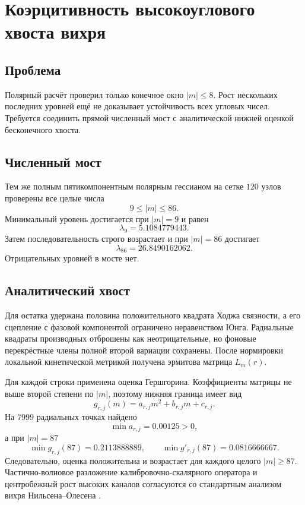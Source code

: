 \chapter{Коэрцитивность высокоуглового хвоста вихря}
\label{ch:v6-bosonic-defect-polar-high-angular-coercivity-gate}

\section{Проблема}

Полярный расчёт проверил только конечное окно $|m|\le8$. Рост нескольких
последних уровней ещё не доказывает устойчивость всех угловых чисел. Требуется
соединить прямой численный мост с аналитической нижней оценкой бесконечного
хвоста.

\section{Численный мост}

Тем же полным пятикомпонентным полярным гессианом на сетке $120$ узлов
проверены все целые числа
\[
  9\le |m|\le86.
\]
Минимальный уровень достигается при $|m|=9$ и равен
\[
  \lambda_9=5.1084779443.
\]
Затем последовательность строго возрастает и при $|m|=86$ достигает
\[
  \lambda_{86}=26.8490162062.
\]
Отрицательных уровней в мосте нет.

\section{Аналитический хвост}

Для остатка удержана половина положительного квадрата Ходжа связности, а его
сцепление с фазовой компонентой ограничено неравенством Юнга. Радиальные
квадраты производных отброшены как неотрицательные, но фоновые перекрёстные
члены полной второй вариации сохранены. После нормировки локальной кинетической
метрикой получена эрмитова матрица $L_m(r)$.

Для каждой строки применена оценка Гершгорина. Коэффициенты матрицы не выше
второй степени по $|m|$, поэтому нижняя граница имеет вид
\[
  g_{r,j}(m)=a_{r,j}m^2+b_{r,j}m+c_{r,j}.
\]
На $7999$ радиальных точках найдено
\[
 \min a_{r,j}=0.00125>0,
\]
а при $|m|=87$
\[
 \min g_{r,j}(87)=0.2113888889,
 \qquad
 \min g'_{r,j}(87)=0.0816666667.
\]
Следовательно, оценка положительна и возрастает для каждого целого
$|m|\ge87$. Частично-волновое разложение калибровочно-скалярного оператора и
центробежный рост высоких каналов согласуются со стандартным анализом вихря
Нильсена--Олесена \cite{high-angular-baacke-kevlishvili}.

